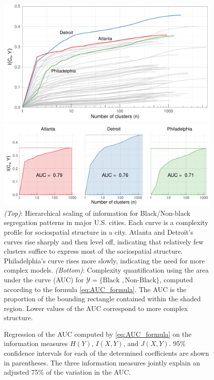 \documentclass[9pt,twocolumn,twoside]{pnas-new}
\begin{document}
	\begin{figure} 
			\includegraphics[width=\linewidth]{figs/binary_loss_curves.pdf}

			\vspace{0.5cm}

			\includegraphics[width=\linewidth]{figs/AUC_illustration.pdf}
			\caption{
				\emph{(Top)}: Hierarchical scaling of information for Black/Non-black segregation patterns in major U.S. cities.  
				Each curve is a complexity profile for sociospatial structure in a city. 
				Atlanta and Detroit's curves rise sharply and then level off, indicating that relatively few clusters suffice to express most of the sociospatial structure. 
				Philadelphia's curve rises more slowly, indicating the need for more complex models. 
				\emph{(Bottom)}:
				Complexity quantification using the area under the curve (AUC) for $\mathcal{Y} = \{\text{Black }, \text{Non-Black}\}$, computed according to the formula \eqref{eq:AUC_formula}. 
				The AUC is the proportion of the bounding rectangle contained within the shaded region. 
				Lower values of the AUC correspond to more complex structure. 
			} \label{fig:AUC}
	\end{figure}
	
	\begin{figure}
		\centering
		
		\caption{
			Regression of the AUC computed by \eqref{eq:AUC_formula} on the information measures $H(Y)$, $I(X,Y)$, and $J(X,Y)$. 
			95\% confidence intervals for each of the determined coefficients are shown in parentheses. 
			The three information measures jointly explain an adjusted 75\% of the variation in the AUC. 
		}\label{fig:regression}
	\end{figure}
\end{document}
